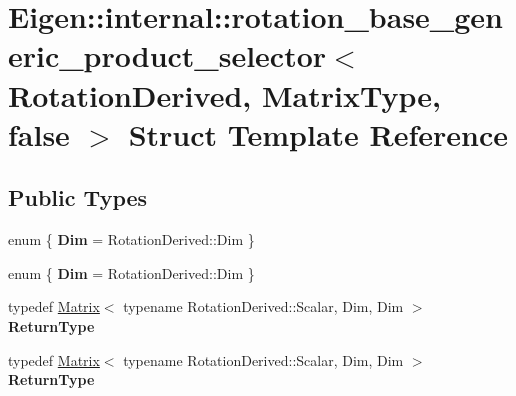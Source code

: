 \hypertarget{struct_eigen_1_1internal_1_1rotation__base__generic__product__selector_3_01_rotation_derived_00_01_matrix_type_00_01false_01_4}{}\section{Eigen\+:\+:internal\+:\+:rotation\+\_\+base\+\_\+generic\+\_\+product\+\_\+selector$<$ Rotation\+Derived, Matrix\+Type, false $>$ Struct Template Reference}
\label{struct_eigen_1_1internal_1_1rotation__base__generic__product__selector_3_01_rotation_derived_00_01_matrix_type_00_01false_01_4}
\subsection*{Public Types}
\begin{DoxyCompactItemize}
\item 
\mbox{\label{struct_eigen_1_1internal_1_1rotation__base__generic__product__selector_3_01_rotation_derived_00_01_matrix_type_00_01false_01_4_a6c64288638233d18a289561b0be3a4e7}} 
enum \{ {\bfseries Dim} = Rotation\+Derived\+:\+:Dim
 \}
\item 
\mbox{\label{struct_eigen_1_1internal_1_1rotation__base__generic__product__selector_3_01_rotation_derived_00_01_matrix_type_00_01false_01_4_a9d23f63c219933d0ffb5f4f7a74d5eb2}} 
enum \{ {\bfseries Dim} = Rotation\+Derived\+:\+:Dim
 \}
\item 
\mbox{\label{struct_eigen_1_1internal_1_1rotation__base__generic__product__selector_3_01_rotation_derived_00_01_matrix_type_00_01false_01_4_a34ec3b1c3773e68c3f8a6c05519aa43a}} 
typedef \hyperlink{group___core___module_class_eigen_1_1_matrix}{Matrix}$<$ typename Rotation\+Derived\+::\+Scalar, Dim, Dim $>$ {\bfseries Return\+Type}
\item 
\mbox{\label{struct_eigen_1_1internal_1_1rotation__base__generic__product__selector_3_01_rotation_derived_00_01_matrix_type_00_01false_01_4_a34ec3b1c3773e68c3f8a6c05519aa43a}} 
typedef \hyperlink{group___core___module_class_eigen_1_1_matrix}{Matrix}$<$ typename Rotation\+Derived\+::\+Scalar, Dim, Dim $>$ {\bfseries Return\+Type}
\end{DoxyCompactItemize}
